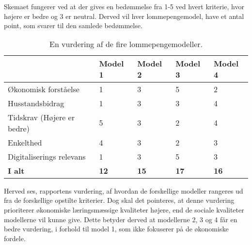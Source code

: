 \noindent Skemaet fungerer ved at der gives en bedømmelse fra 1-5 ved hvert kriterie, hvor højere er bedre og 3 er neutral. Derved vil hver lommepengemodel, have et antal point, som svarer til den samlede bedømmelse.\\

\begin{center}
   \begin{table}
   \begin{tabular}{| l | l | l | l | l |} 
   \hline
   & \textbf{Model 1} & \textbf{Model 2} & \textbf{Model 3} & \textbf{Model 4} \\ \hline
   Økonomisk forståelse & 1 & 3 & 5 & 2 \\ \hline
   Husstandsbidrag & 1 & 3 & 3 & 4 \\ \hline
   Tidskrav (Højere er bedre) & 5 & 3 & 2 & 4 \\ \hline
   Enkelthed & 4 & 3 & 2 & 3 \\ \hline
   Digitaliserings relevans & 1 & 3 & 5 & 3 \\ \hline
   \textbf{I alt} & \textbf{12} & \textbf{15} & \textbf{17} & \textbf{16} \\ \hline
   \end{tabular}
   \caption{En vurdering af de fire lommepengemodeller.}
   \end{table}
\end{center}   

\noindent Herved ses, rapportens vurdering, af hvordan de forskellige modeller rangeres ud fra de forskellige opstilte kriterier.
Dog skal det pointeres, at denne vurdering prioriterer økonomiske læringsmæssige kvaliteter højere, end de sociale kvaliteter modellerne vil kunne give.
Dette betyder derved at modellerne 2, 3 og 4 får en bedre vurdering, i forhold til model 1, som ikke fokuserer på de økonomiske fordele. 
